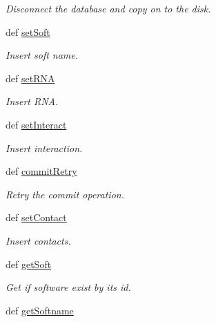 \begin{DoxyCompactItemize}
\begin{DoxyCompactList}\small\item\em \-Disconnect the database and copy on to the disk. \end{DoxyCompactList}\item 
def \hyperlink{classirna_1_1iRNA__stat_1_1Sqlite__manager_1_1Sqlite__manager_af42df8497092368f5495d19655130eb4}{set\-Soft}
\begin{DoxyCompactList}\small\item\em \-Insert soft name. \end{DoxyCompactList}\item 
def \hyperlink{classirna_1_1iRNA__stat_1_1Sqlite__manager_1_1Sqlite__manager_a69bb805061283eeb66b586e016b36388}{set\-R\-N\-A}
\begin{DoxyCompactList}\small\item\em \-Insert \-R\-N\-A. \end{DoxyCompactList}\item 
def \hyperlink{classirna_1_1iRNA__stat_1_1Sqlite__manager_1_1Sqlite__manager_a7d16650c2b61fdd45de8af501fa400a5}{set\-Interact}
\begin{DoxyCompactList}\small\item\em \-Insert interaction. \end{DoxyCompactList}\item 
def \hyperlink{classirna_1_1iRNA__stat_1_1Sqlite__manager_1_1Sqlite__manager_a6326d94414372fcffe8641f74a3595e8}{commit\-Retry}
\begin{DoxyCompactList}\small\item\em \-Retry the commit operation. \end{DoxyCompactList}\item 
def \hyperlink{classirna_1_1iRNA__stat_1_1Sqlite__manager_1_1Sqlite__manager_a84e60dd445cf66a8ebf106fabec54648}{set\-Contact}
\begin{DoxyCompactList}\small\item\em \-Insert contacts. \end{DoxyCompactList}\item 
def \hyperlink{classirna_1_1iRNA__stat_1_1Sqlite__manager_1_1Sqlite__manager_a42b03ccf1a58d15f417642f62ab9e93f}{get\-Soft}
\begin{DoxyCompactList}\small\item\em \-Get if software exist by its id. \end{DoxyCompactList}\item 
def \hyperlink{classirna_1_1iRNA__stat_1_1Sqlite__manager_1_1Sqlite__manager_add4844c353918e2fe23a3ee03eb2e25b}{get\-Softname}

\end{DoxyCompactItemize}
